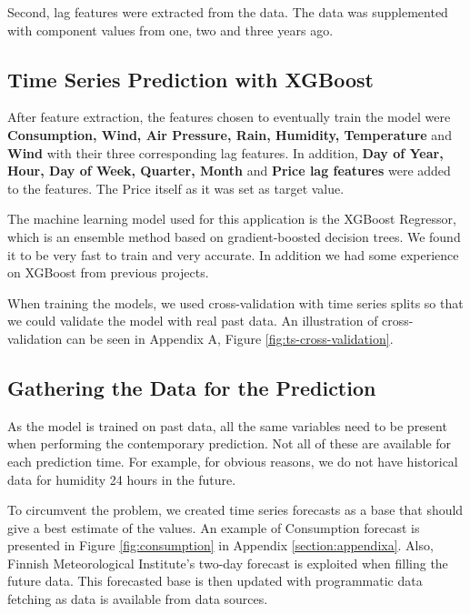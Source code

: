 \documentclass{article}
\begin{document}
Second, lag features were extracted from the data. The data was supplemented with component values from one, two and three years ago. %

\subsection{Time Series Prediction with XGBoost}
\label{subsection:xgboost}

After feature extraction, the features chosen to eventually train the model were \textbf{Consumption, Wind, Air Pressure, Rain, Humidity, Temperature} and \textbf{Wind} with their three corresponding lag features. In addition, \textbf{Day of Year, Hour, Day of Week, Quarter, Month} and \textbf{Price lag features} were added to the features. The Price itself as it was set as target value.

The machine learning model used for this application is the XGBoost Regressor, which is an ensemble method based on gradient-boosted decision trees. We found it to be very fast to train and very accurate. In addition we had some experience on XGBoost from previous projects. 

When training the models, we used cross-validation with time series splits so that we could validate the model with real past data. An illustration of cross-validation can be seen in Appendix A, Figure \ref{fig:ts-cross-validation}.



\subsection{Gathering the Data for the Prediction}
\label{subsection:datafilling}

As the model is trained on past data, all the same variables need to be present when performing the contemporary prediction. Not all of these are available for each prediction time. For example, for obvious reasons, we do not have historical data for humidity 24 hours in the future.

To circumvent the problem, we created time series forecasts as a base that should give a best estimate of the values. An example of Consumption forecast is presented in Figure \ref{fig:consumption} in Appendix \ref{section:appendixa}. Also, Finnish Meteorological Institute's two-day forecast is exploited when filling the future data. This forecasted base is then updated with programmatic data fetching as data is available from data sources.
\end{document}
